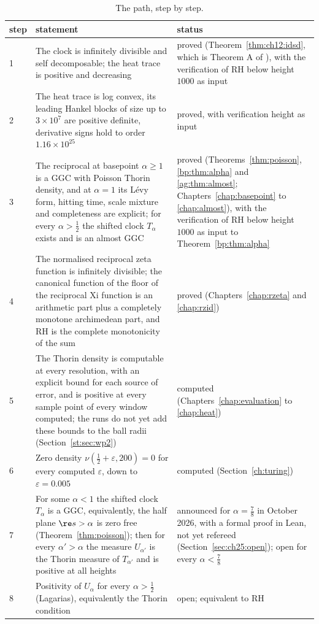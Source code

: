 \begin{table}[htbp]
\centering\small
\begin{tabular}{p{}p{}p{}}
\toprule
step & statement & status\\
\midrule
1 & The clock is infinitely divisible and self decomposable; the heat trace is positive and decreasing & proved (Theorem~\ref{thm:ch12:idsd}, which is Theorem A of \cite{P26}), with the verification of RH below height $1000$ as input\\
2 & The heat trace is log convex, its leading Hankel blocks of size up to $3\times10^7$ are positive definite, derivative signs hold to order $1.16\times10^{25}$ & proved, with verification height as input\\
3 & The reciprocal at basepoint $\alpha\ge1$ is a GGC with Poisson Thorin density, and at $\alpha=1$ its L\'evy form, hitting time, scale mixture and completeness are explicit; for every $\alpha>\frac12$ the shifted clock $T_\alpha$ exists and is an almost GGC & proved (Theorems~\ref{thm:poisson}, \ref{bp:thm:alpha} and \ref{ag:thm:almost}; Chapters~\ref{chap:basepoint} to \ref{chap:almost}), with the verification of RH below height $1000$ as input to Theorem~\ref{bp:thm:alpha}\\
4 & The normalised reciprocal zeta function is infinitely divisible; the canonical function of the floor of the reciprocal Xi function is an arithmetic part plus a completely monotone archimedean part, and RH is the complete monotonicity of the sum & proved (Chapters~\ref{chap:rzeta} and \ref{chap:rzid})\\
5 & The Thorin density is computable at every resolution, with an explicit bound for each source of error, and is positive at every sample point of every window computed; the runs do not yet add these bounds to the ball radii (Section~\ref{st:sec:wp2}) & computed (Chapters~\ref{chap:evaluation} to \ref{chap:heat})\\
6 & Zero density $\nu(\frac12+\varepsilon,200)=0$ for every computed $\varepsilon$, down to $\varepsilon=0.005$ & computed (Section~\ref{ch:turing})\\
7 & For some $\alpha<1$ the shifted clock $T_\alpha$ is a GGC, equivalently, the half plane $\re s>\alpha$ is zero free (Theorem~\ref{thm:poisson}); then for every $\alpha'>\alpha$ the measure $U_{\alpha'}$ is the Thorin measure of $T_{\alpha'}$ and is positive at all heights & announced for $\alpha=\frac78$ in October 2026, with a formal proof in Lean, not yet refereed (Section~\ref{sec:ch25:open}); open for every $\alpha<\frac78$\\
8 & Positivity of $U_\alpha$ for every $\alpha>\frac12$ (Lagarias), equivalently the Thorin condition & open; equivalent to RH\\
\bottomrule
\end{tabular}
\caption{The path, step by step.}
\label{tab:ch25:path}
\end{table}



